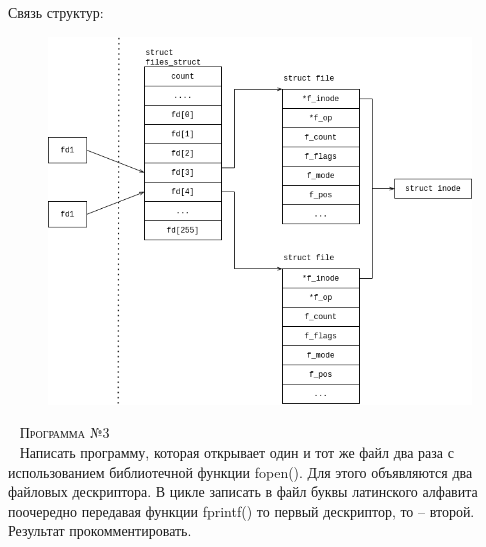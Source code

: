 Связь структур:
\begin{figure}[H]
	\centering
	\includegraphics[scale=0.6]{assets/d_2.png}
\end{figure}


~\newline
\textsc{\huge Программа №3} \\
~\newline
Написать программу, которая открывает один и тот же файл два раза с использованием библиотечной функции fopen(). Для этого объявляются два файловых дескриптора. В цикле записать в файл буквы латинского алфавита поочередно передавая функции fprintf() то первый дескриптор, то – второй.
Результат прокомментировать.

